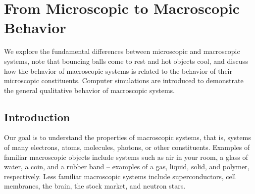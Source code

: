 \section{From Microscopic to Macroscopic Behavior}

We explore the fundamental differences between microscopic and macroscopic systems, note that bouncing balls come to rest and hot objects cool, and discuss how the behavior of macroscopic systems is related to the behavior of their microscopic constituents.
Computer simulations are introduced to demonstrate the general qualitative behavior of macroscopic systems.


\subsection{Introduction}

Our goal is to understand the properties of macroscopic systems, that is, systems of many electrons, atoms, molecules, photons, or other constituents.
Examples of familiar macroscopic objects include systems such as air in your room, a glass of water, a coin, and a rubber band -- examples of a gas, liquid, solid, and polymer, respectively.
Less familiar macroscopic systems include superconductors, cell membranes, the brain, the stock market, and neutron stars.

